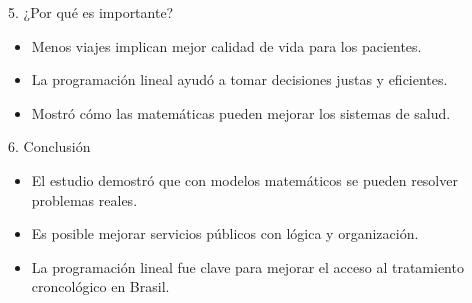 \documentclass{beamer}
\begin{document}
\begin{frame}{5. ¿Por qué es importante?}
\begin{itemize}
  \item Menos viajes implican mejor calidad de vida para los pacientes.
  \item La programación lineal ayudó a tomar decisiones justas y eficientes.
  \item Mostró cómo las matemáticas pueden mejorar los sistemas de salud.
\end{itemize}
\end{frame}

\begin{frame}{6. Conclusión}
\begin{itemize}
  \item El estudio demostró que con modelos matemáticos se pueden resolver problemas reales.
  \item Es posible mejorar servicios públicos con lógica y organización.
  \item La programación lineal fue clave para mejorar el acceso al tratamiento croncológico en Brasil.
\end{itemize}
\end{frame}
\end{document}

